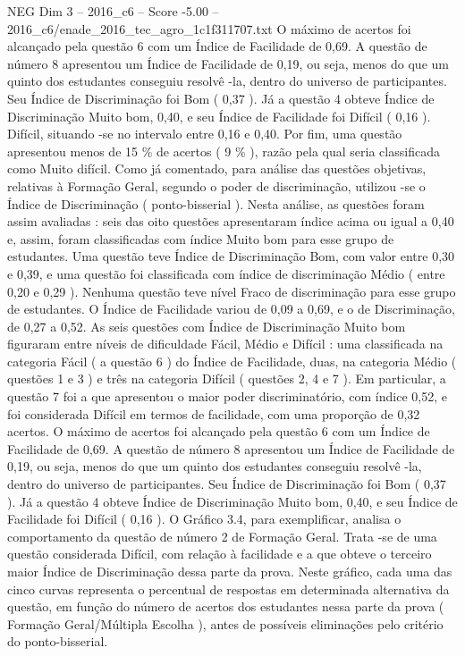 \begin{textsample}{NEG Dim 3 – 2016\_c6 – Score -5.00 – 2016\_c6/enade\_2016\_tec\_agro\_1c1f311707.txt}
O máximo de acertos foi alcançado pela questão 6 com um Índice de Facilidade de 0,69.
A questão de número 8 apresentou um Índice de Facilidade de 0,19, ou seja, menos do que um quinto dos estudantes conseguiu resolvê -la, dentro do universo de participantes.
Seu Índice de Discriminação foi Bom ( 0,37 ).
Já a questão 4 obteve Índice de Discriminação Muito bom, 0,40, e seu Índice de Facilidade foi Difícil ( 0,16 ).
Difícil, situando -se no intervalo entre 0,16 e 0,40.
Por fim, uma questão apresentou menos de 15 \% de acertos ( 9 \% ), razão pela qual seria classificada como Muito difícil.
Como já comentado, para análise das questões objetivas, relativas à Formação Geral, segundo o poder de discriminação, utilizou -se o Índice de Discriminação ( ponto-bisserial ).
Nesta análise, as questões foram assim avaliadas : seis das oito questões apresentaram índice acima ou igual a 0,40 e, assim, foram classificadas com índice Muito bom para esse grupo de estudantes.
Uma questão teve Índice de Discriminação Bom, com valor entre 0,30 e 0,39, e uma questão foi classificada com índice de discriminação Médio ( entre 0,20 e 0,29 ).
Nenhuma questão teve nível Fraco de discriminação para esse grupo de estudantes.
O Índice de Facilidade variou de 0,09 a 0,69, e o de Discriminação, de 0,27 a 0,52.
As seis questões com Índice de Discriminação Muito bom figuraram entre níveis de dificuldade Fácil, Médio e Difícil : uma classificada na categoria Fácil ( a questão 6 ) do Índice de Facilidade, duas, na categoria Médio ( questões 1 e 3 ) e três na categoria Difícil ( questões 2, 4 e 7 ).
Em particular, a questão 7 foi a que apresentou o maior poder discriminatório, com índice 0,52, e foi considerada Difícil em termos de facilidade, com uma proporção de 0,32 acertos.
O máximo de acertos foi alcançado pela questão 6 com um Índice de Facilidade de 0,69.
A questão de número 8 apresentou um Índice de Facilidade de 0,19, ou seja, menos do que um quinto dos estudantes conseguiu resolvê -la, dentro do universo de participantes.
Seu Índice de Discriminação foi Bom ( 0,37 ).
Já a questão 4 obteve Índice de Discriminação Muito bom, 0,40, e seu Índice de Facilidade foi Difícil ( 0,16 ).
O Gráfico 3.4, para exemplificar, analisa o comportamento da questão de número 2 de Formação Geral.
Trata -se de uma questão considerada Difícil, com relação à facilidade e a que obteve o terceiro maior Índice de Discriminação dessa parte da prova.
Neste gráfico, cada uma das cinco curvas representa o percentual de respostas em determinada alternativa da questão, em função do número de acertos dos estudantes nessa parte da prova ( Formação Geral/Múltipla Escolha ), antes de possíveis eliminações pelo critério do ponto-bisserial.

\end{textsample}
